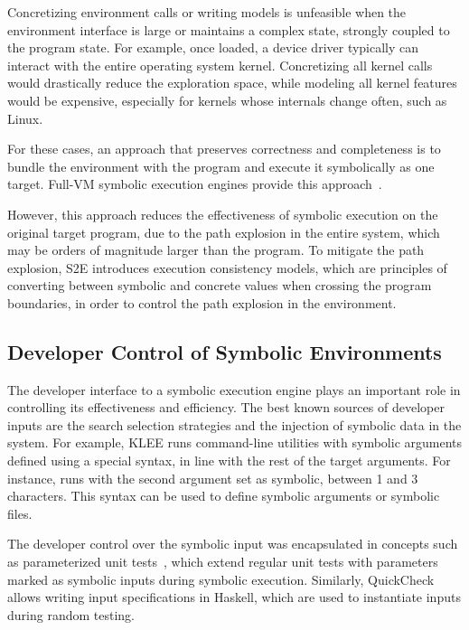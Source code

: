 Concretizing environment calls or writing models is unfeasible when the environment interface is large or maintains a complex state, strongly coupled to the program state.
%
For example, once loaded, a device driver typically can interact with the entire operating system kernel.  Concretizing all kernel calls would drastically reduce the exploration space, while modeling all kernel features would be expensive, especially for kernels whose internals change often, such as Linux.

For these cases, an approach that preserves correctness and completeness is to bundle the environment with the program and execute it symbolically as one target.
%
Full-VM symbolic execution engines provide this approach~\cite{s2e,bitBlaze}.

However, this approach reduces the effectiveness of symbolic execution on the original target program, due to the path explosion in the entire system, which may be orders of magnitude larger than the program.
%
To mitigate the path explosion, S2E introduces execution consistency models, which are principles of converting between symbolic and concrete values when crossing the program boundaries, in order to control the path explosion in the environment.



\subsection{Developer Control of Symbolic Environments}

The developer interface to a symbolic execution engine plays an important role in controlling its effectiveness and efficiency.
%
The best known sources of developer inputs are the search selection strategies and the injection of symbolic data in the system.
%
For example, KLEE runs command-line utilities with symbolic arguments defined using a special syntax, in line with the rest of the target arguments.  For instance,  runs  with the second argument set as symbolic, between 1 and 3 characters.  This syntax can be used to define symbolic arguments or symbolic files.

The developer control over the symbolic input was encapsulated in concepts such as parameterized unit tests~\cite{tillmann-puts}, which extend regular unit tests with parameters marked as symbolic inputs during symbolic execution.
%
Similarly, QuickCheck~\cite{quickcheck} allows writing input specifications in Haskell, which are used to instantiate inputs during random testing.

